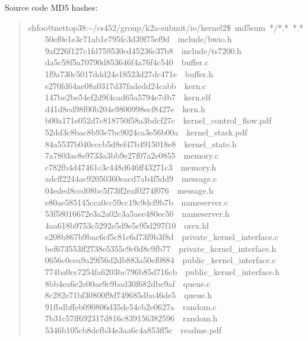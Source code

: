 \documentclass[letterpaper]{article}
\begin{document}
Source code MD5 hashes:
%
\begin{quote}{\ttfamily \raggedright \noindent
chfoo@nettop38:\textasciitilde{}/cs452/group/k2a-submit/io/kernel2\$~md5sum~*/*.*~*.*\\
~~~~50ef0e1e3c71ab1e795fc3d39f75ef9d~~include/bwio.h\\
~~~~9af226f127c1fd759530cd45236c37b8~~include/ts7200.h\\
~~~~da5c58f5a70790d853646f4a76f4c540~~buffer.c\\
~~~~1f9a730c5017ddd24e18523d27dc471e~~buffer.h\\
~~~~e270fd64ae08a0317d37fadedd24cabb~~kern.c\\
~~~~147be2be54ef2d9f4cad65a5794e7db7~~kern.elf\\
~~~~d41d8cd98f00b204e9800998ecf8427e~~kern.h\\
~~~~b00a171e052d7c818750f58a3bdcf27c~~kernel\_control\_flow.pdf\\
~~~~52dd3c8bac8b93e7bc9024ca3e56b00a~~kernel\_stack.pdf\\
~~~~84a5537b040cccb5d8ef47b4915018e8~~kernel\_state.h\\
~~~~7a7803ae8e9733a3bb9e27f07a2e0855~~memory.c\\
~~~~c782fb4d47461c3c448d646ff43271c3~~memory.h\\
~~~~adcff2244ac92050360eacd7ab4f5dd9~~message.c\\
~~~~04eded8ccd08bc5f73ff2eaf0274f076~~message.h\\
~~~~e80ae585145cca0cc59cc19c9dcf9b7b~~nameserver.c\\
~~~~53f58016672e3a2a02c3a5aee480ec50~~nameserver.h\\
~~~~4aa618b9753c5292e5d9e5c95d297f10~~orex.ld\\
~~~~e208b867b9bac6cf5c81c6d73f9b3f8d~~private\_kernel\_interface.c\\
~~~~bef673553ff2738e5355c9c0d8c9fb77~~private\_kernel\_interface.h\\
~~~~0656c0cea9a29f56d2db883a50ef0884~~public\_kernel\_interface.c\\
~~~~774ba0cc7254fa6203bc796b85d716cb~~public\_kernel\_interface.h\\
~~~~8bb4ea6e2e00ae9c9bad30f682dbe9af~~queue.c\\
~~~~8c282e71bf30800f9d749685dba46de5~~queue.h\\
~~~~91fbdbffeb090806d35dc54cb2e0627a~~random.c\\
~~~~7b31c57ff692317d816c839156382596~~random.h\\
~~~~5346b105cb8defb34e3aa6c4a853ff5c~~readme.pdf\\
}
\end{quote}
\end{document}
